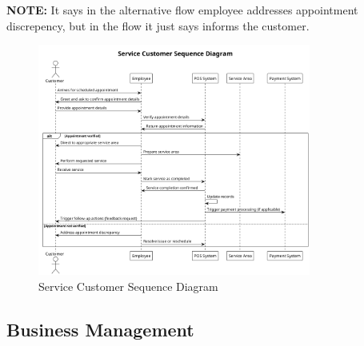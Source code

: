 \documentclass[]{VUMIFTemplateClass}
\newcommand{\noticecomment}[1]{%
    \begin{tcolorbox}[colback=blue!20, colframe=blue!60, arc=0pt, outer arc=0pt, boxrule=1pt, left=3pt, right=3pt, top=3pt, bottom=3pt]
        \textbf{\textcolor{blue!70!black}{NOTE:}} #1
    \end{tcolorbox}
}
\begin{document}
\noticecomment{It says in the alternative flow employee addresses appointment discrepency, but in the flow it just says informs the customer. }

\begin{figure}[H]
    \centering
    \includegraphics[width=0.8\textwidth]{images/diagrams/services/service_customer_sequence.png}
    \caption{Service Customer Sequence Diagram}
    \label{fig:service_customer_sequence}
\end{figure}

\subsection{Business Management}
\end{document}
